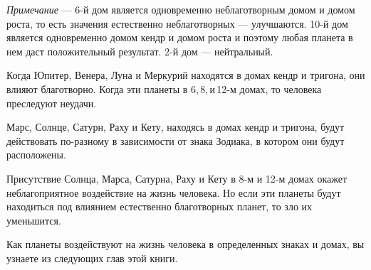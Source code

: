 \emph{Примечание} --- 6-й дом является одновременно неблаготворным домом и домом роста, то есть значения естественно неблаготворных --- улучшаются. 10-й дом является одновременно домом кендр и домом роста и поэтому любая планета в нем даст положительный результат. 2-й дом --- нейтральный.

Когда Юпитер, Венера, Луна и Меркурий находятся в домах кендр и тригона, они влияют благотворно. Когда эти планеты в 6,\,8,\,и\,12-м домах, то человека преследуют неудачи.

Марс, Солнце, Сатурн, Раху и Кету, находясь в домах кендр и тригона, будут действовать по-разному в зависимости от знака Зодиака, в котором они будут расположены.

Присутствие Солнца, Марса, Сатурна, Раху и Кету в 8-м и 12-м домах окажет неблагоприятное воздействие на жизнь человека. Но если эти планеты будут находиться под влиянием естественно благотворных планет, то зло их уменьшится.

Как планеты воздействуют на жизнь человека в определенных знаках и домах, вы узнаете из следующих глав этой книги.
